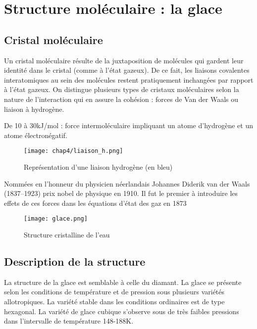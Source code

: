 \section{Structure moléculaire : la glace}
\subsection*{Cristal moléculaire}
Un cristal moléculaire résulte de la juxtaposition de molécules
qui gardent leur identité dans le cristal (comme à l'état gazeux).
De ce fait, les liaisons covalentes interatomiques au sein des
molécules restent pratiquement inchangées par rapport à l'état
gazeux.
On distingue plusieurs types de cristaux moléculaires selon la
nature de l'interaction qui en assure la cohésion :
forces de Van der Waals ou liaison à hydrogène.

\begin{rem}
    De 10 à 30kJ/mol : force intermoléculaire impliquant un
    atome d'hydrogène et un atome électronégatif.
\end{rem}
\begin{figure}
    \centering
    \texttt{[image: chap4/liaison\_h.png]}
    \caption[Liaison hydrogène]{Représentation d'une liaison
        hydrogène (en bleu)}\label{fig:4_liason_h}
\end{figure}
\begin{rem}
    Nommées en l'honneur du physicien néerlandais Johannes
    Diderik van der Waals (1837\---1923) prix nobel de
    physique en 1910. Il fut le premier à introduire les
    effets de ces forces dans les équations d'état des gaz
    en 1873
\end{rem}
\begin{figure}
    \centering
    \texttt{[image: glace.png]}
    \caption{Structure cristalline de l'eau}\label{fig:4_glace}
\end{figure}

\subsection{Description de la structure}
La structure de la glace est semblable à celle du diamant.
La glace se présente selon les conditions de température et
de pression sous plusieurs variétés allotropiques.
La variété stable dans les conditions ordinaires est
de type hexagonal. La variété de glace cubique s’observe
sous de très faibles pressions dans l’intervalle de
température 148\--188K.


